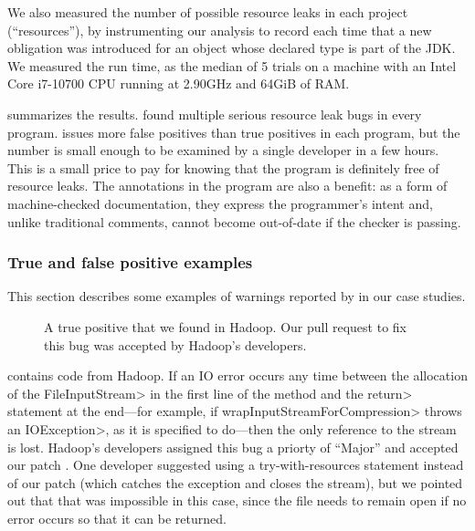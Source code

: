 We also measured the number of
possible resource leaks in each project (``resources''),
by instrumenting our analysis to record each time that
a new obligation was introduced for an object whose declared type
is part of the JDK.
We measured the run time,
as the median of 5 trials on
a machine with an Intel Core i7-10700 CPU running at 2.90GHz and 64GiB of RAM\@.


 summarizes the results. \Tool found multiple
serious resource leak bugs in every program. \Tool issues
more false positives than true positives in each program, but
the number is small enough to be examined by a single developer in a
few hours.  This is a small price to pay for knowing that the program is
definitely free of resource leaks.  The annotations in the program are
also a benefit: as a form of machine-checked documentation, they
express the programmer's intent and, unlike traditional comments,
cannot become out-of-date if the checker is passing.

\subsubsection{True and false positive examples}
\label{sec:examples}

This section describes some examples of warnings reported by \Tool
in our case studies.

\begin{figure}
  
  \caption{A true positive that we found in Hadoop. Our pull request
    to fix this bug was accepted by Hadoop's developers.}
  \label{fig:hadoop-bug}
\end{figure}

 contains code from Hadoop. If an IO error
occurs any time between the allocation of the \<FileInputStream>
in the first line of the method and the \<return> statement
at the end---for example, if \<wrapInputStreamForCompression>
throws an \<IOException>, as it is specified to do---then the
only reference to the stream is lost. Hadoop's developers
assigned this bug a priorty of ``Major'' and accepted our patch
.
One developer suggested using a try-with-resources statement instead
of our patch (which catches the exception and closes the stream),
but we pointed out that that was impossible in this case, since
the file needs to remain open if no error occurs so that it can be
returned.

